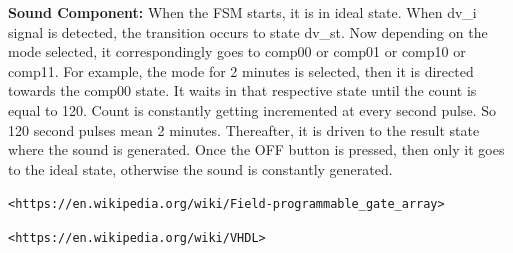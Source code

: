 \documentclass[12pt,a4paper]{article}
\begin{document}
 \textbf{Sound Component:} When the FSM starts, it is in ideal state. When dv\_i signal is detected, the transition occurs to state dv\_st. Now depending on the mode selected, it correspondingly goes to comp00 or comp01 or comp10 or comp11. For example, the mode for 2 minutes is selected, then it is directed towards the comp00 state. It waits in that respective state until the count is equal to 120. Count is constantly getting incremented at every second pulse. So 120 second pulses mean 2 minutes. Thereafter, it is driven to the result state where the sound is generated. Once the OFF button is pressed, then only it goes to the ideal state, otherwise the sound is constantly generated. 



\newpage


\raggedright

\newpage                                                                                %
\begin{thebibliography}{}

\texttt{<https://en.wikipedia.org/wiki/Field-programmable\_gate\_array>}

\texttt{<https://en.wikipedia.org/wiki/VHDL>}



\end{thebibliography}



\clearpage
\end{document}
